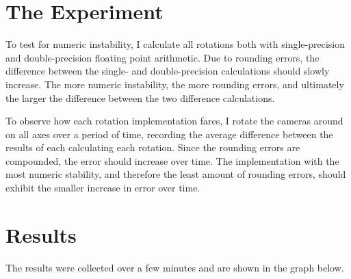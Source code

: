 \documentclass[a4paper]{article}
\begin{document}
\section{The Experiment}

To test for numeric instability, I calculate all rotations both with single-precision and double-precision floating point arithmetic. Due to rounding errors, the difference between the single- and double-precision calculations should slowly increase. The more numeric instability, the more rounding errors, and ultimately the larger the difference between the two difference calculations.

To observe how each rotation implementation fares, I rotate the cameras around on all axes over a period of time, recording the average difference between the results of each calculating each rotation. Since the rounding errors are compounded, the error should increase over time. The implementation with the most numeric stability, and therefore the least amount of rounding errors, should exhibit the smaller increase in error over time.

\section{Results}

The results were collected over a few minutes and are shown in the graph below.

\vspace{5 mm}

\begin{center}
\end{center}
\end{document}
